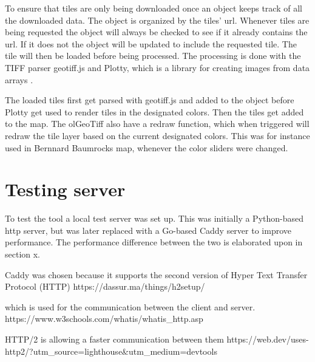 To ensure that tiles are only being downloaded once an object keeps track of all the downloaded data. The object is organized by the tiles’ url. 
Whenever tiles are being requested the object will always be checked to see if it already contains the url. If it does not the object will be updated to include the requested tile. The tile will then be loaded before being processed. \citep{Baumrocks}
The processing is done with the TIFF parser geotiff.js 
\citep{Geotiff}
and Plotty, which is a library for creating images from data arrays \citep{Plotty}.

The loaded tiles first get parsed with geotiff.js and added to the object before Plotty get used to render tiles in the designated colors. Then the tiles get added to the map.
\citep{Baumrocks}
The olGeoTiff also have a redraw function, which when triggered will redraw the tile layer based on the current designated colors. This was for instance used in Bernnard Baumrocks map, whenever the color sliders were changed. 

\section{Testing server}
To test the tool a local test server was set up. This was initially a Python-based http server, but was later replaced with a Go-based Caddy server to improve performance. The performance difference between the two is elaborated upon in section x.

Caddy was chosen because it supports the second version of Hyper Text Transfer Protocol (HTTP)
https://dassur.ma/things/h2setup/



which is used for the communication between the client and server.
https://www.w3schools.com/whatis/whatis_http.asp

HTTP/2 is allowing a faster communication between them
https://web.dev/uses-http2/?utm_source=lighthouse&utm_medium=devtools
